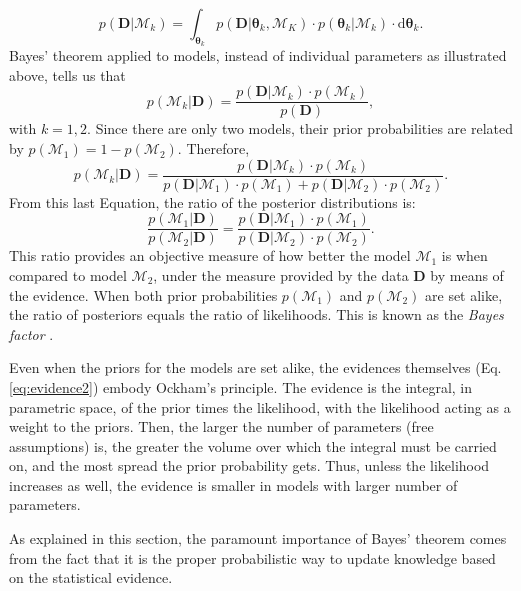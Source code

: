  \begin{equation}
p(\mathbf{D}|\mathcal{M}_k)=\int_{\boldsymbol{\theta}_k} p(\mathbf{D}|\boldsymbol{\theta}_k,\mathcal{M}_K)\cdot p(\boldsymbol{\theta}_k|\mathcal{M}_k)\cdot \mathrm{d}\boldsymbol{\theta}_k. \label{eq:evidence2}
\end{equation}
Bayes' theorem applied to models, instead of individual parameters as illustrated above, tells us that
\begin{equation}
p(\mathcal{M}_k|\mathbf{D})=\frac{p(\mathbf{D}|\mathcal{M}_k)\cdot p(\mathcal{M}_k)}{p(\mathbf{D})},
\end{equation}
with $k=1,2$. Since there are only two models, their prior probabilities are related by $p(\mathcal{M}_1)= 1- p(\mathcal{M}_2)$. Therefore,
 \begin{equation}
p(\mathcal{M}_k|\mathbf{D})=\frac{p(\mathbf{D}|\mathcal{M}_k)\cdot p(\mathcal{M}_k)}{p(\mathbf{D}|\mathcal{M}_1)\cdot p(\mathcal{M}_1)+p(\mathbf{D}|\mathcal{M}_2)\cdot p(\mathcal{M}_2)}.
\end{equation}
From this last Equation, the ratio of the posterior distributions is:
\begin{equation}
\label{eq:modelselection}
\frac{p(\mathcal{M}_1|\mathbf{D})}{p(\mathcal{M}_2|\mathbf{D})}=\frac{p(\mathbf{D}|\mathcal{M}_1)\cdot p(\mathcal{M}_1)}{p(\mathbf{D}|\mathcal{M}_2)\cdot p(\mathcal{M}_2)}.
\end{equation}
This ratio provides an objective measure of how better the model $\mathcal{M}_1$ is when compared to model $\mathcal{M}_2$, under the measure provided by the data $\mathbf{D}$ by means of the evidence. When both prior probabilities  $p(\mathcal{M}_1)$ and $p(\mathcal{M}_2)$ are set alike, the ratio of posteriors equals the ratio of likelihoods. This is known as the \emph{Bayes factor} \cite[for a similar derivation and some examples of its application see][]{Kaas1995}. 

Even when the priors for the models are set alike, the evidences themselves (Eq. \ref{eq:evidence2}) embody Ockham's principle. The evidence is the integral, in parametric space, of the prior times the likelihood, with the likelihood acting as a weight to the priors.  Then, the larger the number of parameters (free assumptions) is, the greater the volume over which the integral must be carried on, and the most spread the prior probability gets. Thus, unless the likelihood increases as well, the evidence is smaller in models with larger number of parameters.

As explained in this section, the paramount importance of Bayes' theorem comes from the fact that it is the proper probabilistic way to update knowledge based on the {statistical} evidence.


